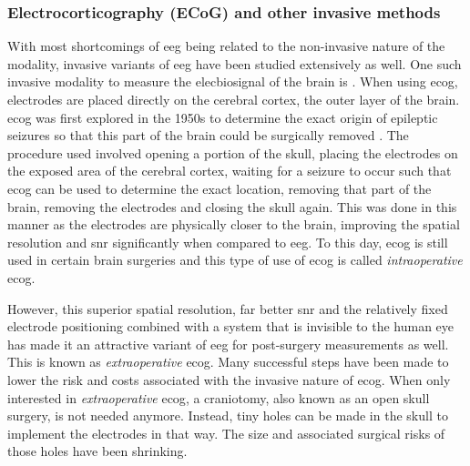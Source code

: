 
\subsubsection{Electrocorticography (ECoG) and other invasive methods}
\label{subsubsec:biomedical_signals_measuring_brain_modalities_ecog}

With most shortcomings of \gls{eeg} being related to the non-invasive nature of the modality, invasive variants of \gls{eeg} have been studied extensively as well.
One such invasive modality to measure the \gls{elecbiosignal} of the brain is .
When using \gls{ecog}, electrodes are placed directly on the cerebral cortex, the outer layer of the brain.
\Gls{ecog} was first explored in the 1950s to determine the exact origin of epileptic seizures so that this part of the brain could be surgically removed \citep{ecog_origin}.
The procedure used involved opening a portion of the skull, placing the electrodes on the exposed area of the cerebral cortex, waiting for a seizure to occur such that \gls{ecog} can be used to determine the exact location, removing that part of the brain, removing the electrodes and closing the skull again.
This was done in this manner as the electrodes are physically closer to the brain, improving the spatial resolution and \gls{snr} significantly when compared to \gls{eeg}.
To this day, \gls{ecog} is still used in certain brain surgeries and this type of use of \gls{ecog} is called \textit{intraoperative} \gls{ecog}.

However, this superior spatial resolution, far better \gls{snr} and the relatively fixed electrode positioning combined with a system that is invisible to the human eye has made it an attractive variant of \gls{eeg} for post-surgery measurements as well.
This is known as \textit{extraoperative} \gls{ecog}.
Many successful steps have been made to lower the risk and costs associated with the invasive nature of \gls{ecog}.
When only interested in \textit{extraoperative} \gls{ecog}, a craniotomy, also known as an open skull surgery, is not needed anymore.
Instead, tiny holes can be made in the skull to implement the electrodes in that way.
The size and associated surgical risks of those holes have been shrinking.

